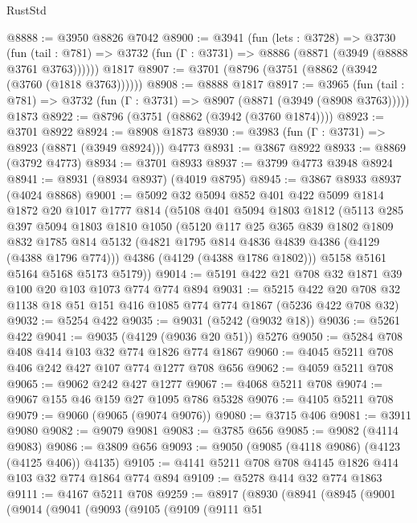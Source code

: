 \begin{lexlean}{RustStd}
\begin{coremodule}
@8888 := @3950 @8826 @7042
@8900 := @3941
    (fun (lets : @3728) =>
    @3730
      (fun (tail : @781) => @3732 (fun (Γ : @3731) => @8886 (@8871 (@3949 (@8888 @3761 @3763))))))
    @1817
@8907 := @3701 (@8796 (@3751 (@8862 (@3942 (@3760 (@1818 @3763))))))
@8908 := @8888 @1817
@8917 := @3965
    (fun (tail : @781) => @3732 (fun (Γ : @3731) => @8907 (@8871 (@3949 (@8908 @3763)))))
    @1873
@8922 := @8796 (@3751 (@8862 (@3942 (@3760 @1874))))
@8923 := @3701 @8922
@8924 := @8908 @1873
@8930 := @3983 (fun (Γ : @3731) => @8923 (@8871 (@3949 @8924))) @4773
@8931 := @3867 @8922
@8933 := @8869 (@3792 @4773)
@8934 := @3701 @8933
@8937 := @3799 @4773 @3948 @8924
@8941 := @8931 (@8934 @8937) (@4019 @8795)
@8945 := @3867 @8933 @8937 (@4024 @8868)
@9001 := @5092
    @32
    @5094
    @852
    @401
    @422
    @5099
    @1814
    @1872
    @20
    @1017
    @1777
    @814
    (@5108
      @401
      @5094
      @1803
      @1812
      (@5113
        @285
        @397
        @5094
        @1803
        @1810
        @1050
        (@5120
          @117
          @25
          @365
          @839
          @1802
          @1809
          @832
          @1785
          @814
          @5132
          (@4821 @1795 @814 @4836 @4839 @4386 (@4129 (@4388 @1796 @774)))
          @4386
          (@4129 (@4388 @1786 @1802)))
        @5158
        @5161
        @5164
        @5168
        @5173
        @5179))
@9014 := @5191 @422 @21 @708 @32 @1871 @39 @100 @20 @103 @1073 @774 @774 @894
@9031 := @5215 @422 @20 @708 @32 @1138 @18 @51 @151 @416 @1085 @774 @774 @1867 (@5236 @422 @708 @32)
@9032 := @5254 @422
@9035 := @9031 (@5242 (@9032 @18))
@9036 := @5261 @422
@9041 := @9035 (@4129 (@9036 @20 @51)) @5276
@9050 := @5284 @708 @408 @414 @103 @32 @774 @1826 @774 @1867
@9060 := @4045 @5211 @708 @406 @242 @427 @107 @774 @1277 @708 @656
@9062 := @4059 @5211 @708
@9065 := @9062 @242 @427 @1277
@9067 := @4068 @5211 @708
@9074 := @9067 @155 @46 @159 @27 @1095 @786 @5328
@9076 := @4105 @5211 @708
@9079 := @9060 (@9065 (@9074 @9076))
@9080 := @3715 @406
@9081 := @3911 @9080
@9082 := @9079 @9081
@9083 := @3785 @656
@9085 := @9082 (@4114 @9083)
@9086 := @3809 @656
@9093 := @9050 (@9085 (@4118 @9086) (@4123 (@4125 @406)) @4135)
@9105 := @4141 @5211 @708 @708 @4145 @1826 @414 @103 @32 @774 @1864 @774 @894
@9109 := @5278 @414 @32 @774 @1863
@9111 := @4167 @5211 @708
@9259 := @8917
    (@8930
      (@8941
        (@8945
          (@9001
            (@9014
              (@9041
                (@9093
                  (@9105
                    (@9109
                      (@9111
                        @51

\end{coremodule}
\end{lexlean}
